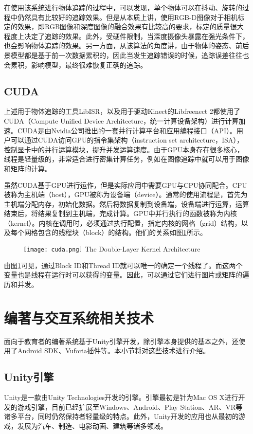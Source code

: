 在使用该系统进行物体追踪的过程中，可以发现，单个物体可以在抖动、旋转的过程中仍然具有比较好的追踪效果。但是从本质上讲，使用RGB-D图像对于相机标定的效果，即RGB图像和深度图像的融合效果有比较高的要求，标定的质量很大程度上决定了追踪的效果。此外，受硬件限制，当深度摄像头暴露在强光条件下，也会影响物体追踪的效果。另一方面，从该算法的角度讲，由于物体的姿态、前后景模型都是基于前一次数据累积的，因此当发生追踪错误的时候，追踪误差往往也会累积，影响模型，最终很难恢复正确的追踪。

\subsection{CUDA}
上述用于物体追踪的工具LibISR，以及用于驱动Kinect的Libfreenect 2都使用了CUDA\cite{CUDARef}（Compute Unified Device Architecture，统一计算设备架构）进行计算加速。CUDA是由Nvidia公司推出的一套并行计算平台和应用编程接口（API）。用户可以通过CUDA访问GPU的指令集架构（instruction set architecture，ISA），控制显卡中的并行运算模块，提升并发运算速度。由于GPU本身存在很多核心，线程是轻量级的，非常适合进行密集计算任务，例如在图像追踪中就可以用于图像和矩阵的计算。

虽然CUDA基于GPU进行运作，但是实际应用中需要GPU与CPU协同配合。CPU被称为主机端（host），GPU被称为设备端（device）。通常的使用流程是，首先为主机端分配内存，初始化数据。然后将数据复制到设备端，设备端进行运算，运算结束后，将结果复制到主机端，完成计算。GPU中并行执行的函数被称为内核（kernel）。内核在调用时，必须通过执行配置，指定内核的网格（grid）结构，以及每个网格包含的线程块（block）的结构。他们的关系如图\ref{fig:ceda}所示。

\begin{figure}[!htp]
  \centering
  \texttt{[image: cuda.png]}
    {The Double-Layer Kernel Architecture }
 \label{fig:ceda}
\end{figure}

由图\ref{fig:ceda}可见，通过Block ID和Thread ID就可以唯一的确定一个线程了。而这两个变量也是线程在运行时可以获得的变量。因此，可以通过它们进行图片或矩阵的遍历和并发。

\section{编著与交互系统相关技术}
面向于教育者的编著系统基于Unity引擎开发，除引擎本身提供的基本之外，还使用了Android SDK、Vuforia插件等。本小节将对这些技术进行介绍。

\subsection{Unity引擎}
Unity\cite{Unity}是一款由Unity Technologies开发的引擎。引擎最初是针为Mac OS X进行开发的游戏引擎，目前已经扩展至Windows、Android、Play Station、AR、VR等诸多平台，同时仍然保持者轻量级的特点。此外，Unity开发的应用也从最初的游戏，发展为汽车、制造、电影动画、建筑等诸多领域。

